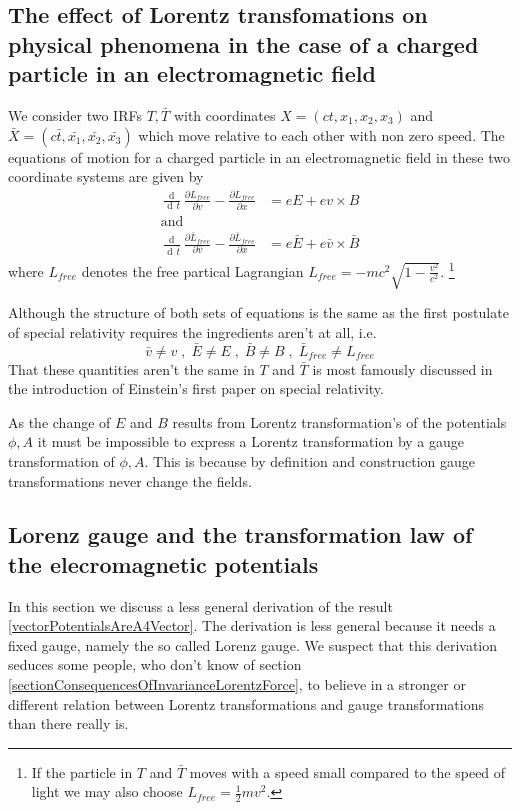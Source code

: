 \documentclass{article}
\DeclareMathOperator{\dd}{d\!}
\begin{document}
\subsection{The effect of Lorentz transfomations on physical phenomena in the case of a charged particle in an electromagnetic field}

We consider two IRFs $T, \bar{T}$ with coordinates $X=(ct, x_1, x_2, x_3)$ and $\bar{X}=(c \bar{t}, \bar{x_1}, \bar{x_2}, \bar{x_3})$ which move relative to each other with non zero speed.
The equations of motion for a charged particle in an electromagnetic field in these two coordinate systems are given by
\begin{align}
  \frac{\dd}{\dd t} \frac{\partial L_{free}}{\partial v} - \frac{\partial L_{free}}{\partial x} &= e E + e v \times B \\
  \text{and} \nonumber \\
  \frac{\dd}{\dd \bar{t}} \frac{\partial \bar{L}_{free}}{\partial \bar{v}} - \frac{\partial \bar{L}_{free}}{\partial \bar{x}} &= e \bar{E} + e \bar{v} \times \bar{B}
\end{align}
where $L_{free}$ denotes the free partical Lagrangian $L_{free} = - m c^2 \sqrt{1 - \frac{v^2}{c^2}}$.
\footnote{If the particle in $T$ and $\bar{T}$ moves with a speed small compared to the speed of light we may also choose $L_{free} = \frac{1}{2} m v^2$.}

Although the structure of both sets of equations is the same as the first postulate of special relativity requires the ingredients aren't at all, i.e.
\begin{equation}
  \bar{v} \neq v \;,\; \bar{E} \neq E \;,\; \bar{B} \neq B \;,\; \bar{L}_{free} \neq L_{free}
\end{equation}
That these quantities aren't the same in $T$ and $\bar{T}$ is most famously discussed in the introduction of Einstein's first paper on special relativity\cite{EinsteinSpecialRelativity}.

As the change of $E$ and $B$ results from Lorentz transformation's of the potentials $\phi, A$ it must be impossible to express a Lorentz transformation by a gauge transformation of $\phi, A$.
This is because by definition and construction gauge transformations never change the fields.

\subsection{Lorenz gauge and the transformation law of the elecromagnetic potentials}
In this section we discuss a less general derivation of the result \ref{vectorPotentialsAreA4Vector}.
The derivation is less general because it needs a fixed gauge, namely the so called Lorenz gauge.
We suspect that this derivation seduces some people, who don't know of section \ref{sectionConsequencesOfInvarianceLorentzForce}, to believe in a stronger or different relation between Lorentz transformations and gauge transformations than there really is.
\end{document}
